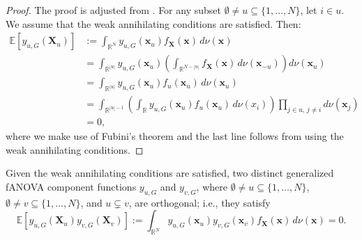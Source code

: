 \begin{proof}
The proof is adjusted from \cite{rahman2014}. For any subset $\emptyset \ne u \subseteq \{1, \ldots, N\}$, let $i \in u$. We assume that the weak annihilating conditions are satisfied. Then:
\begin{align*}
\mathbb{E}[y_{u,G}(\boldsymbol{X}_u)] 
&:= \int_{\mathbb{R}^N} y_{u,G}(\boldsymbol{x}_u) f_{\boldsymbol{X}}(\boldsymbol{x})\, d \nu (\boldsymbol{x}) \\[0.5em]
&= \int_{\mathbb{R}^{|u|}} y_{u,G}(\boldsymbol{x}_u) \left( \int_{\mathbb{R}^{N - |u|}} f_{\boldsymbol{X}}(\boldsymbol{x}) \, d \nu(\boldsymbol{x}_{-u}) \right) d \nu(\boldsymbol{x}_u) \\[0.5em]
&= \int_{\mathbb{R}^{|u|}} y_{u,G}(\boldsymbol{x}_u) f_u(\boldsymbol{x}_u)\, d \nu(\boldsymbol{x}_u) \\[0.5em]
&= \int_{\mathbb{R}^{|u| - 1}} \left( \int_{\mathbb{R}} y_{u,G}(\boldsymbol{x}_u) f_u(\boldsymbol{x}_u) \, d \nu(x_i) \right) \prod_{j \in u,\, j \ne i} d \nu(\boldsymbol{x}_j) \\[0.5em]
&= 0,
\end{align*}
where we make use of Fubini's theorem and the last line follows from using the weak annihilating conditions.
\end{proof}

\begin{proposition}\label{prop:hierarchical_orthogonality}
    Given the weak annihilating conditions are satisfied, two distinct generalized fANOVA component functions $y_{u,G}$ and $y_{v,G}$, where $\emptyset \neq u \subseteq \{1,\ldots,N\}$, $\emptyset \neq v \subseteq \{1,\ldots,N\}$, and $u \subsetneq v$, are orthogonal; i.e., they satisfy
\begin{equation}
    \mathbb{E}[y_{u, G}(\boldsymbol{X}_u)y_{v, G}(\boldsymbol{X}_v)] := \int_{\mathbb{R}^N} y_{u, G}(\boldsymbol{x}_u) y_{v, G}(\boldsymbol{x}_v) f_{\boldsymbol{X}}(\boldsymbol{x}) \, d\nu (\boldsymbol{x}) = 0.
\end{equation}
\end{proposition}

